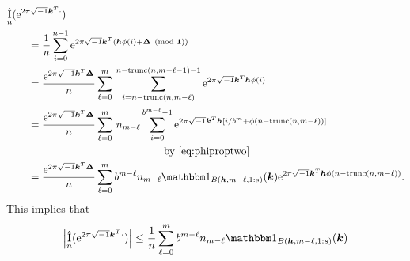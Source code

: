 \documentclass{iitthesis-au} %
\DeclareMathOperator{\appxint}{\hat{I}}
\DeclareMathOperator{\trun}{trunc}
\begin{document}
\begin{align*}
    \MoveEqLeft{\appxint_{n}(\me^{2 \pi \sqrt{-1} \vk^T \cdot}) } \\
    &= \frac 1{n} \sum_{i=0}^{n-1} \me^{2 \pi \sqrt{-1} \vk^T (\vh\phi(i) + \vDelta \pmod{\vone})} \\
    \nonumber
    &= \frac {\me^{2 \pi \sqrt{-1} \vk^T \vDelta}}{n} \sum_{\ell = 0}^{m} \,
    \sum_{i=n - \trun(n,m-\ell) }^{n - \trun(n,m-\ell-1)  -1} \me^{2 \pi \sqrt{-1} \vk^T \vh\phi(i)} \\
    &= \frac {\me^{2 \pi \sqrt{-1} \vk^T \vDelta}}{n} \sum_{\ell = 0}^{m} \, n_{m-\ell}
    \sum_{i=0 }^{b^{m-\ell}  -1} \me^{2 \pi \sqrt{-1} \vk^T \vh[i/b^m + \phi(n - \trun(n,m-\ell))]} \\
    & \hspace{30ex} \text{by \eqref{eq:phiproptwo}} \\
    & = \frac {\me^{2 \pi \sqrt{-1} \vk^T \vDelta}}{n} \sum_{\ell = 0}^{m} b^{m-\ell} n_{m - \ell} \bbone_{B(\vh,m-\ell,1:s)}(\vk) \me^{2 \pi \sqrt{-1} \vk^T \vh\phi(n - \trun(n,m-\ell))}.
\end{align*}
This implies that
\begin{equation} \label{eq:ihatarbn}
    \abs{\appxint_{n}(\me^{2 \pi \sqrt{-1} \vk^T \cdot})} \le \frac {1}{n} \sum_{\ell = 0}^{m} b^{m-\ell} n_{m - \ell} \bbone_{B(\vh,m-\ell, 1:s)}(\vk)
\end{equation}
\end{document}
